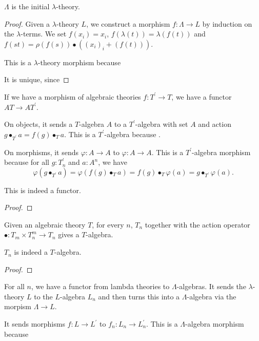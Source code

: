 \begin{lemma}
  $ \Lambda $ is the initial $ \lambda $-theory.
\end{lemma}
\begin{proof}
  Given a $ \lambda $-theory $ L $, we construct a morphism $ f: \Lambda \to L $ by induction on the $ \lambda $-terms. We set $ f(x_i) = x_i $, $ f(\lambda(t)) = \lambda(f(t)) $ and $ f(st) = \rho(f(s)) \bullet ((x_i)_i + (f(t))) $.

  This is a $ \lambda $-theory morphism because \TODO

  It is unique, since \TODO
\end{proof}

\begin{definition}
  If we have a morphism of algebraic theories $ f: T^\prime \to T $, we have a functor $ AT \to AT^\prime $.

  On objects, it sends a $ T $-algebra $ A $ to a $ T^\prime $-algebra with set $ A $ and action $ g \bullet_{T^\prime} a = f(g) \bullet_T a $. This is a $ T^\prime $-algebra because \TODO.

  On morphisms, it sends $ \varphi: A \to A $ to $ \varphi: A \to A $. This is a $ T^\prime $-algebra morphism because for all $ g: T^\prime_n $ and $ a: A^n $, we have
  \[ \varphi(g \bullet_{T^\prime} a) = \varphi(f(g) \bullet_T a) = f(g) \bullet_T \varphi(a) = g \bullet_{T^\prime} \varphi(a). \]
\end{definition}
\begin{lemma}
  This is indeed a functor.
\end{lemma}
\begin{proof}
  \TODO
\end{proof}

\begin{definition}
  Given an algebraic theory $ T $, for every $ n $, $ T_n $ together with the action operator $ \bullet: T_m \times T_n^m \to T_n $ gives a $ T $-algebra.
\end{definition}

\begin{lemma}
  $ T_n $ is indeed a $ T $-algebra.
\end{lemma}
\begin{proof}
  \TODO
\end{proof}

\begin{definition}
  For all $ n $, we have a functor from lambda theories to $ \Lambda $-algebras. It sends the $ \lambda $-theory $ L $ to the $ L $-algebra $ L_n $ and then turns this into a $ \Lambda $-algebra via the morpism $ \Lambda \to L $.

  It sends morphisms $ f: L \to L^\prime $ to $ f_n : L_n \to L^\prime_n $. This is a $ \Lambda $-algebra morphism because \TODO
\end{definition}

